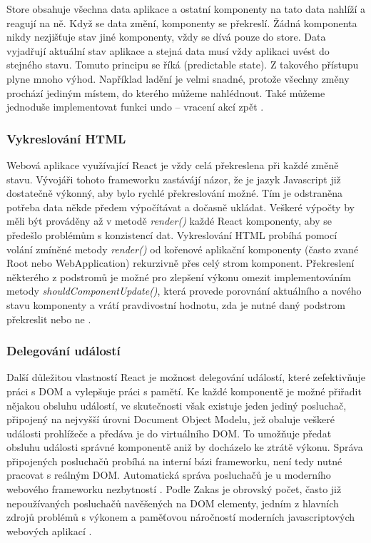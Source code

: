 Store obsahuje všechna data aplikace a ostatní komponenty na tato data nahlíží a reagují na ně. Když se data změní, komponenty se překreslí. Žádná komponenta nikdy nezjišťuje stav jiné komponenty, vždy se dívá pouze do store. Data vyjadřují aktuální stav aplikace a stejná data musí vždy aplikaci uvést do stejného stavu. Tomuto principu se říká  (predictable state). Z takového přístupu plyne mnoho výhod. Například ladění je velmi snadné, protože všechny změny prochází jediným místem, do kterého můžeme nahlédnout. Také můžeme jednoduše implementovat funkci undo – vracení akcí zpět \cite{react_book} \cite{flux} \cite{react_thinking}.

\subsubsection{Vykreslování HTML}
Webová aplikace využívající React je vždy celá překreslena při každé změně stavu. Vývojáři tohoto frameworku zastávájí názor, že je jazyk Javascript již dostatečně výkonný, aby bylo rychlé překreslování možné. Tím je odstraněna potřeba data někde předem výpočítávat a dočasně ukládat. Veškeré výpočty by měli být prováděny až v metodě \textit{render()} každé React komponenty, aby se předešlo problémům s konzistencí dat. Vykreslování HTML probíhá pomocí volání zmíněné metody \textit{render()} od kořenové aplikační komponenty (často zvané Root nebo WebApplication) rekurzivně přes celý strom komponent. Překreslení některého z podstromů je možné pro zlepšení výkonu omezit implementováním metody \textit{shouldComponentUpdate()}, která provede porovnání aktuálního a nového stavu komponenty a vrátí pravdivostní hodnotu, zda je nutné daný podstrom překreslit nebo ne \cite{react} \cite{react_components} \cite{react_book}.

\subsubsection{Delegování událostí}
Další důležitou vlastností React je možnost delegování událostí, které zefektivňuje práci s DOM a vylepšuje práci s pamětí. Ke každé komponentě je možné přiřadit nějakou obsluhu událostí, ve skutečnosti však existuje jeden jediný posluchač, připojený na nejvyšší úrovni Document Object Modelu, jež obaluje veškeré události prohlížeče a předáva je do virtuálního DOM. To umožňuje předat obsluhu události správné komponentě aniž by docházelo ke ztrátě výkonu. Správa připojených posluchačů probíhá na interní bázi frameworku, není tedy nutné pracovat s reálným DOM. Automatická správa posluchačů je u moderního webového frameworku nezbytností \cite{react} \cite{react_components}. Podle Zakas je obrovský počet, často již nepoužívaných posluchačů navěšených na DOM elementy, jedním z hlavních zdrojů problémů s výkonem a paměťovou náročností moderních javascriptových webových aplikací \cite{zakas_js}.

